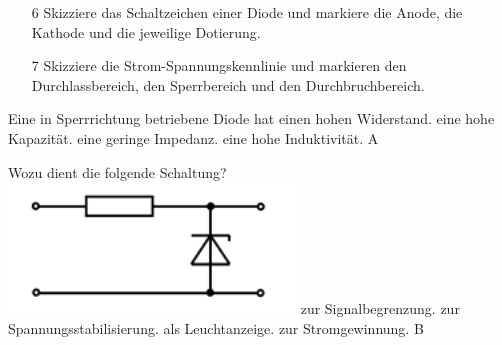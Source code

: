 \begin{enumerate}
\itemsep1pt\parskip0pt
\item[6] Skizziere das Schaltzeichen einer Diode und markiere die Anode, die Kathode und die jeweilige Dotierung.
    \loesung{
    \begin{figure}[H]
    \centering 
    
    \end{figure}
    }
\item[7] Skizziere die Strom-Spannungskennlinie und markieren den Durchlassbereich, den Sperrbereich und den Durchbruchbereich.
\end{enumerate}

{Eine in Sperrrichtung betriebene Diode hat}%
{einen hohen Widerstand.}%
{eine hohe Kapazität.}%
{eine geringe Impedanz.}%
{eine hohe Induktivität.}%
{A}%

{Wozu dient die folgende Schaltung?\\ \includegraphics[scale=0.63]{Diode/Bilder/TC508.png}}%
{zur Signalbegrenzung.}%
{zur Spannungsstabilisierung.}%
{als Leuchtanzeige.}%
{zur Stromgewinnung.}%
{B}%

